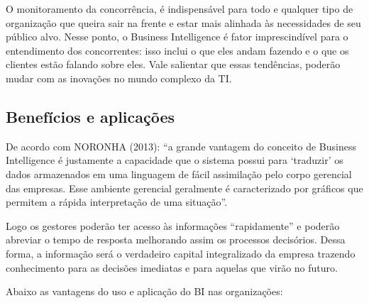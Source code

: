 O monitoramento da concorrência, \'{e} indispens\'{a}vel para todo e qualquer tipo de organiza\c{c}\~{a}o que queira sair na frente e estar mais alinhada \`{a}s necessidades de seu  público alvo. Nesse ponto, o Business Intelligence \'{e} fator imprescindível para o entendimento dos concorrentes: isso inclui o que eles andam fazendo e o que os clientes est\~{a}o falando sobre eles.
Vale salientar que essas tendências, poder\~{a}o mudar com as inova\c{c}ões no mundo complexo da TI.

\subsection{Benefícios e aplica\c{c}ões}

De acordo com NORONHA (2013): “a grande vantagem do conceito de Business Intelligence é justamente a capacidade que o sistema possui para ‘traduzir’ os dados armazenados em uma linguagem de fácil assimilação pelo corpo gerencial das empresas. Esse ambiente gerencial geralmente é caracterizado por gráficos que permitem a rápida interpretação de uma situação”.

Logo os gestores poderão ter acesso às informações “rapidamente” e poderão abreviar o tempo de resposta melhorando assim os processos decisórios. Dessa forma, a informação será o verdadeiro capital integralizado da empresa trazendo conhecimento para as decisões imediatas e para aquelas que virão no futuro.

Abaixo as vantagens do uso e aplicação do BI nas organiza\c{c}ões:

